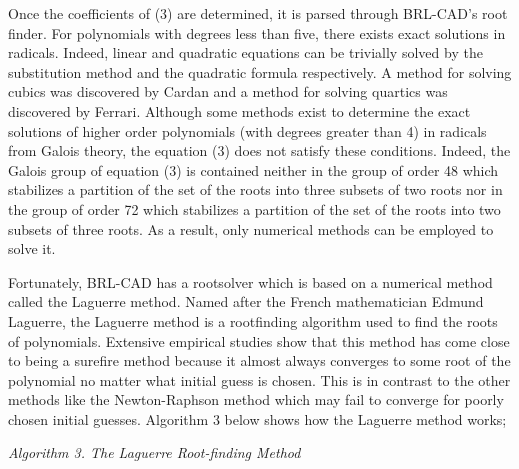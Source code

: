 \hspace{30} Once   the   coefficients   of   (3)   are   determined,   it   is   parsed   through  
BRL­-CAD's   root   finder.   For   polynomials   with   degrees   less   than   five,   there  
exists   exact   solutions   in   radicals.   Indeed,   linear   and   quadratic   equations   can   be  
trivially   solved   by   the   substitution   method   and   the   quadratic   formula  
respectively.   A   method   for   solving   cubics   was   discovered   by   Cardan   and   a  
method   for   solving   quartics   was   discovered   by   Ferrari.   Although   some  
methods   exist   to   determine   the   exact   solutions   of   higher   order   polynomials  
(with   degrees   greater   than   4)   in   radicals   from   Galois   theory,   the   equation   (3)  
does   not   satisfy   these   conditions.   Indeed,   the   Galois   group   of   equation   (3)   is  
contained   neither   in   the   group   of   order   48   which   stabilizes   a   partition   of   the   set  
of   the   roots   into   three   subsets   of   two   roots   nor   in   the   group   of   order   72   which  
stabilizes   a   partition   of   the   set   of   the   roots   into   two   subsets   of   three   roots.   As   a  
result, only numerical methods can be employed to solve it.  
 
Fortunately,   BRL-­CAD   has   a   root­solver   which   is   based   on   a   numerical  
method   called   the   Laguerre   method.   Named   after   the   French   mathematician  
Edmund   Laguerre,   the   Laguerre   method   is   a   root­finding   algorithm   used   
to find the roots of polynomials.   Extensive   empirical   studies   show   that   this   method   has   come  
close   to   being   a   sure­fire   method   because   it   almost   always   converges   to   some  
root   of   the   polynomial   no   matter   what   initial   guess   is   chosen.   This   is   in   contrast  
to   the   other   methods   like   the   Newton­-Raphson   method   which   may   fail   to  
converge   for   poorly   chosen   initial   guesses.   Algorithm   3   below   shows   how   the  
Laguerre method works;  

\hspace{85} \textit{Algorithm 3. The Laguerre Root­-finding Method}

